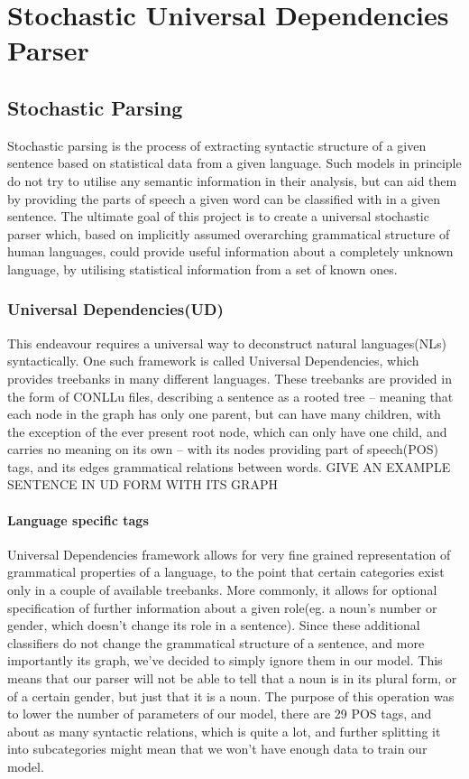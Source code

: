 \chapter{Stochastic Universal Dependencies Parser}
\section{Stochastic Parsing}
Stochastic parsing is the process of extracting syntactic structure of a given sentence based on 
statistical data from a given language. Such models in principle do not try to utilise any
semantic information in their analysis, but can aid them by providing the parts of speech
a given word can be classified with in a given sentence. The ultimate goal of this project
is to create a universal stochastic parser which, based on implicitly assumed overarching
grammatical structure of human languages, could provide useful information about a completely
unknown language, by utilising statistical information from a set of known ones.
\subsection{Universal Dependencies(UD)}
This endeavour requires a universal way to deconstruct natural languages(NLs) syntactically.
One such framework is called Universal Dependencies, which provides treebanks in many different
languages. These treebanks are provided in the form of CONLLu files, describing a sentence as a
rooted tree -- meaning that each node in the graph has only one parent, but can have many children, with the exception
of the ever present root node, which can only have one child, and carries no meaning on its own -- with its nodes providing
part of speech(POS) tags, and its edges grammatical relations between words. 
GIVE AN EXAMPLE SENTENCE IN UD FORM WITH ITS GRAPH
\subsubsection{Language specific tags}
Universal Dependencies framework allows for very fine grained representation of grammatical properties of a language,
to the point that certain categories exist only in a couple of available treebanks. More commonly, it allows for optional
specification of further information about a given role(eg. a noun's number or gender, which doesn't change its role in a sentence).
Since these additional classifiers do not change the grammatical structure of a sentence, and more importantly its graph, we've
decided to simply ignore them in our model. This means that our parser will not be able to tell that a noun is in its plural
form, or of a certain gender, but just that it is a noun. The purpose of this operation was to lower the number of parameters of our
model, there are 29 POS tags, and about as many syntactic relations, which is quite a lot, and further splitting it into subcategories might
mean that we won't have enough data to train our model.
